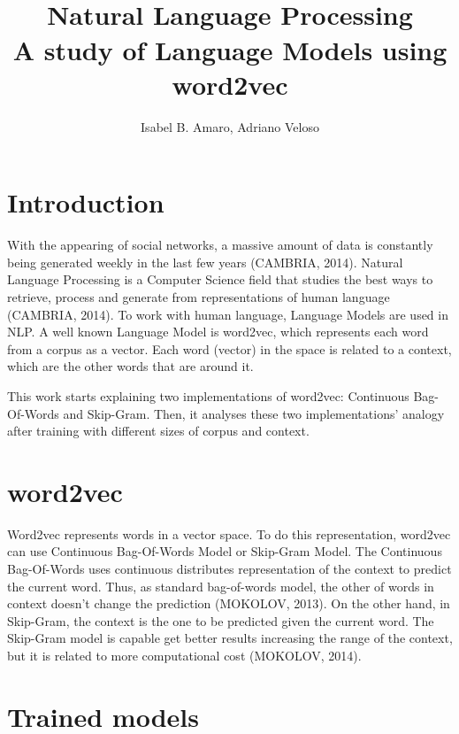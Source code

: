 \documentclass[12pt]{article}
\title{\\ Natural Language Processing\\ A study of Language Models using word2vec}
\author{Isabel B. Amaro\inst{1}, Adriano Veloso\inst{2}}
\begin{document}
 

\maketitle

\begin{abstract}
\end{abstract}

\section{Introduction}

\hspace{6ex} With the appearing of social networks, a massive amount of data is constantly being generated weekly in the last few years (CAMBRIA, 2014). Natural Language Processing is a Computer Science field that studies the best ways to retrieve, process and generate from representations of human language (CAMBRIA, 2014). To work with human language, Language Models are used in NLP. A well known Language Model is word2vec, which represents each word from a corpus as a vector. Each word (vector) in the space is related to a context, which are the other words that are around it.

This work starts explaining two implementations of word2vec: Continuous Bag-Of-Words and Skip-Gram. Then, it analyses these two implementations' analogy after training with different sizes of corpus and context. 

\section{word2vec}

\hspace{6ex} Word2vec represents words in a vector space. To do this representation, word2vec can use Continuous Bag-Of-Words Model or Skip-Gram Model. The Continuous Bag-Of-Words uses continuous distributes representation of the context to predict the current word. Thus, as standard bag-of-words model, the other of words in context doesn't change the prediction (MOKOLOV, 2013). On the other hand, in Skip-Gram, the context is the one to be predicted given the current word. The Skip-Gram model is capable get better results increasing the range of the context, but it is related to more computational cost (MOKOLOV, 2014).

\section{Trained models}
\end{document}
